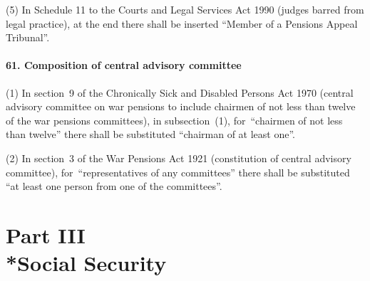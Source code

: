 \documentclass[12pt,a4paper]{article}
\begin{document}
(5) In Schedule 11 to the Courts and Legal Services Act 1990 (judges barred from legal practice), at the end there shall be inserted “Member of a Pensions Appeal Tribunal”.

\subsection{61. Composition of central advisory committee}

(1) In section~9 of the Chronically Sick and Disabled Persons Act 1970 (central advisory committee on war pensions to include chairmen of not less than twelve of the war pensions committees), in subsection~(1), for~“chairmen of not less than twelve” there shall be substituted “chairman of at least one”.

(2) In section~3 of the War Pensions Act 1921 (constitution of central advisory committee), for~“representatives of any committees” there shall be substituted “at least one person from one of the committees”.


\part[Part III --- Social Security]{Part III\\*Social Security}

\renewcommand\parthead{--- Part III}

\end{document}
